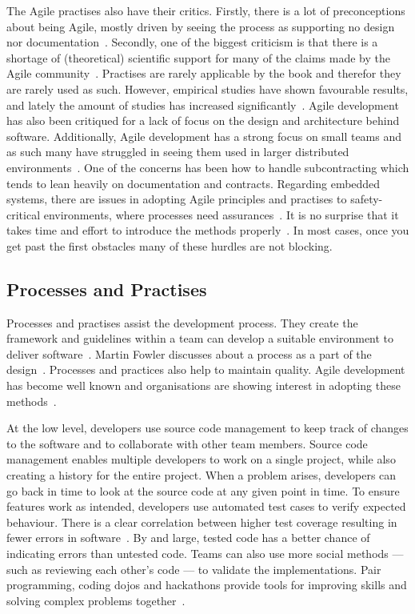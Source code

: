 \documentclass[english]{tktltiki2}
\begin{document}
The Agile practises also have their critics. Firstly, there is a lot of preconceptions about being Agile, mostly driven by seeing the process as supporting no design nor documentation~\cite{HMP12}. Secondly, one of the biggest criticism is that there is a shortage of (theoretical) scientific support for many of the claims made by the Agile community~\cite{DD08, DNB12}. Practises are rarely applicable by the book and therefor they are rarely used as such. However, empirical studies have shown favourable results, and lately the amount of studies has increased significantly~\cite{DD08, SS10, DNB12}. Agile development has also been critiqued for a lack of focus on the design and architecture behind software. Additionally, Agile development has a strong focus on small teams and as such many have struggled in seeing them used in larger distributed environments~\cite{TFR02}. One of the concerns has been how to handle subcontracting which tends to lean heavily on documentation and contracts. Regarding embedded systems, there are issues in adopting Agile principles and practises to safety-critical environments, where processes need assurances~\cite{TFR02}. It is no surprise that it takes time and effort to introduce the methods properly~\cite{DD08}. In most cases, once you get past the first obstacles many of these hurdles are not blocking.

\subsection{Processes and Practises}

Processes and practises assist the development process. They create the framework and guidelines within a team can develop a suitable environment to deliver software~\cite{Kni07}. Martin Fowler discusses about a process as a part of the design~\cite{Fow05}. Processes and practices also help to maintain quality. Agile development has become well known and organisations are showing interest in adopting these methods~\cite{DD08}.

At the low level, developers use source code management to keep track of changes to the software and to collaborate with other team members. Source code management enables multiple developers to work on a single project, while also creating a history for the entire project. When a problem arises, developers can go back in time to look at the source code at any given point in time. To ensure features work as intended, developers use automated test cases to verify expected behaviour. There is a clear correlation between higher test coverage resulting in fewer errors in software~\cite{MND09}. By and large, tested code has a better chance of indicating errors than untested code. Teams can also use more social methods — such as reviewing each other’s code — to validate the implementations. Pair programming, coding dojos and hackathons provide tools for improving skills and solving complex problems together~\cite{DD08, HHL13, RKD13}.
\end{document}
